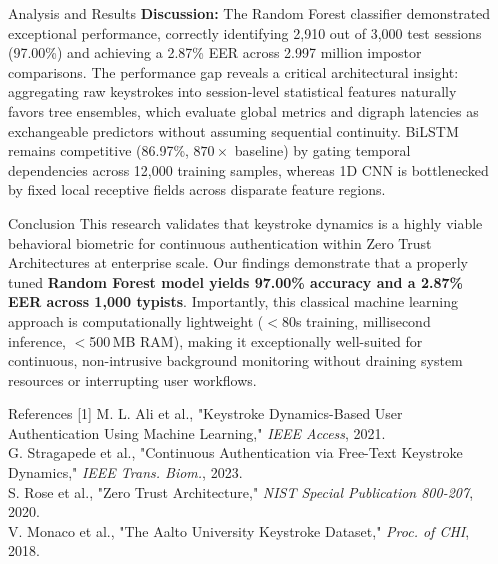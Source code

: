 \documentclass[final]{beamer}
\newlength{\sepwidth}
\newlength{\colwidth}
\newcommand{\separatorcolumn}{\begin{column}{\sepwidth}\end{column}}
\begin{document}
\begin{frame}[t]
\begin{columns}[t]
\begin{column}{\colwidth}
\begin{block}{Analysis and Results}
    \vspace{0.2em}
    \textbf{Discussion:} The Random Forest classifier demonstrated exceptional performance, correctly identifying 2,910 out of 3,000 test sessions (97.00\%) and achieving a 2.87\% EER across 2.997 million impostor comparisons. The performance gap reveals a critical architectural insight: aggregating raw keystrokes into session-level statistical features naturally favors tree ensembles, which evaluate global metrics and digraph latencies as exchangeable predictors without assuming sequential continuity. BiLSTM remains competitive (86.97\%, $870\times$ baseline) by gating temporal dependencies across 12,000 training samples, whereas 1D CNN is bottlenecked by fixed local receptive fields across disparate feature regions.
  \end{block}

  \begin{block}{Conclusion}
    This research validates that keystroke dynamics is a highly viable behavioral biometric for continuous authentication within Zero Trust Architectures at enterprise scale. Our findings demonstrate that a properly tuned \textbf{Random Forest model yields 97.00\% accuracy and a 2.87\% EER across 1{,}000 typists}. Importantly, this classical machine learning approach is computationally lightweight ($<$80s training, millisecond inference, $<$500\,MB RAM), making it exceptionally well-suited for continuous, non-intrusive background monitoring without draining system resources or interrupting user workflows.
  \end{block}
  
  \begin{block}{References}
    \footnotesize
    [1] M. L. Ali et al., "Keystroke Dynamics-Based User Authentication Using Machine Learning," \textit{IEEE Access}, 2021. \\
    [2] G. Stragapede et al., "Continuous Authentication via Free-Text Keystroke Dynamics," \textit{IEEE Trans. Biom.}, 2023. \\
    [3] S. Rose et al., "Zero Trust Architecture," \textit{NIST Special Publication 800-207}, 2020. \\
    [4] V. Monaco et al., "The Aalto University Keystroke Dataset," \textit{Proc. of CHI}, 2018.
  \end{block}

\end{column}

\separatorcolumn
\end{columns}
\end{frame}
\end{document}
